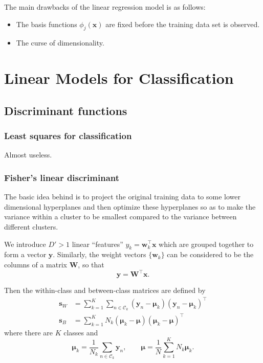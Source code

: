 \documentclass[a4paper]{report}
\renewcommand{\bf}{\mathbf}
\renewcommand{\cal}{\mathcal}
\newcommand{\bs}{\boldsymbol}
\begin{document}
The main drawbacks of the linear regression model is as follows:
\begin{itemize}
	 \item The basis functions $\phi_j(\bf{x})$ are fixed before the training data set is observed.
	 \item The curse of dimensionality.
\end{itemize}
\section{Linear Models for Classification}
\subsection{Discriminant functions}
\subsubsection{Least squares for classification}
Almost useless.
\subsubsection{Fisher's linear discriminant}
The basic idea behind is to project the original training data to some lower dimensional hyperplanes and then optimize these hyperplanes so as to make the variance within a cluster to be smallest compared to the variance between different clusters.

We introduce $D' > 1$ linear ``features'' $y_k = \bf{w}_k^{\intercal} \bf{x}$ which are grouped together to form a vector $\bf{y}$. Similarly, the weight vectors $\{ \bf{w}_k \}$ can be considered to be the columns of a matrix $\bf{W}$, so that
\begin{equation}
	\bf{y} = \bf{W}^{\intercal} \bf{x}.
\end{equation}

Then the within-class and between-class matrices are defined by
\begin{align}
	\bf{s}_W &= \sum_{k=1}^K \sum_{n\in \cal{C}_k} (\bf{y}_n - \bs{\mu}_k)(\bf{y}_n - \bs{\mu}_k)^{\intercal} \\
	\bf{s}_B &= \sum_{k=1}^K N_k (\bs{\mu}_k -\bs{\mu})(\bs{\mu}_k-\bs{\mu})^{\intercal}
\end{align}
where there are $K$ classes and
\begin{equation}
	\bs{\mu}_k = \frac{1}{N_k} \sum_{n \in \cal{C}_k} \bf{y}_n, \qquad \bs{\mu} = \frac{1}{N} \sum_{k=1}^{K}N_k \bs{\mu}_k.
\end{equation}
\end{document}

